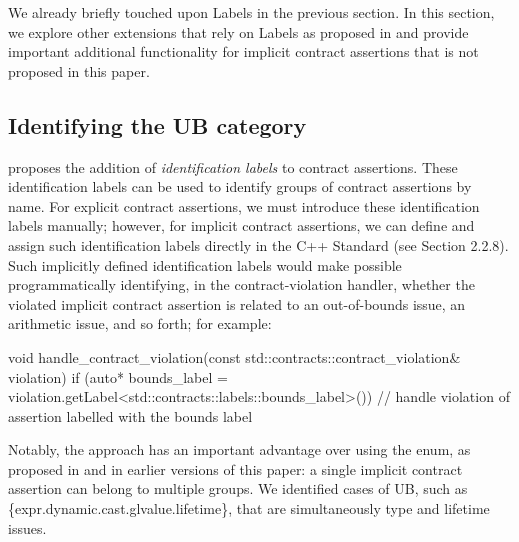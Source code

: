 We already briefly touched upon Labels in the previous section. In this section, we explore other exten\-sions that rely on Labels as proposed in \cite{P3400R1} and provide important additional functionality for implicit contract assertions that is not proposed in this paper.

\subsection{Identifying the UB category}
\label{idlabels}

\cite{P3400R1} proposes the addition of \emph{identification labels} to contract assertions. These identification labels can be used to identify groups of contract assertions by name. For explicit contract assertions, we must introduce these identification labels manually; however, for implicit contract assertions, we can define and assign such identification labels directly in the C++ Standard (see \cite{P3400R1} Section 2.2.8). Such implicitly defined identification labels would make possible programmatically identifying, in the contract-violation handler, whether the violated implicit contract assertion  is related to an out-of-bounds issue, an arithmetic issue, and so forth; for example:

\begin{codeblock}
void handle_contract_violation(const std::contracts::contract_violation& violation)
{
  if (auto* bounds_label =
      violation.getLabel<std::contracts::labels::bounds_label>()) {
      // handle violation of assertion labelled with the bounds label
  }
}
\end{codeblock} 

%
%

Notably, the \cite{P3400R1} approach has an important advantage over using the  enum, as proposed in \cite{P3081R1} and in earlier versions of this paper: a single implicit contract assertion can belong to multiple groups. We identified cases of UB, such as \{expr.dynamic.cast.glvalue.lifetime\}, that are simultaneously type and lifetime issues.

